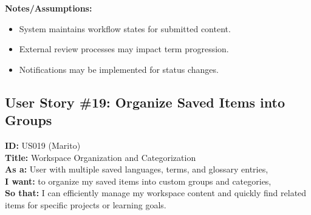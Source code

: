 \documentclass[12pt]{article}
\begin{document}
\vspace{1em}
\textbf{Notes/Assumptions:}
\begin{itemize}
    \item System maintains workflow states for submitted content.
    \item External review processes may impact term progression.
    \item Notifications may be implemented for status changes.
\end{itemize}


\subsection{User Story \#19: Organize Saved Items into Groups}
\textbf{ID:} US019 (Marito) \\
\textbf{Title:} Workspace Organization and Categorization \\
\textbf{As a:} User with multiple saved languages, terms, and glossary entries, \\
\textbf{I want:} to organize my saved items into custom groups and categories, \\
\textbf{So that:} I can efficiently manage my workspace content and quickly find related items for specific projects or learning goals.
\end{document}
